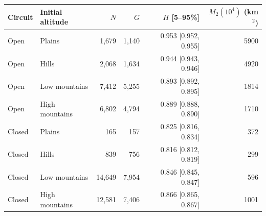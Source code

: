 \begin{tabular}{llrrrr}
\toprule
Circuit & Initial altitude & $N$ & $G$ & $H$ [5--95\%] & $M_2(10^4)$ (km$^2$)\\
\midrule
Open & Plains & 1,679 & 1,140 & 0.953 [0.952, 0.955] & 5900\\
Open & Hills & 2,068 & 1,634 & 0.944 [0.943, 0.946] & 4920\\
Open & Low mountains & 7,412 & 5,255 & 0.893 [0.892, 0.895] & 1814\\
Open & High mountains & 6,802 & 4,794 & 0.889 [0.888, 0.890] & 1710\\
Closed & Plains & 165 & 157 & 0.825 [0.816, 0.834] & 372\\
Closed & Hills & 839 & 756 & 0.816 [0.812, 0.819] & 299\\
Closed & Low mountains & 14,649 & 7,954 & 0.846 [0.845, 0.847] & 596\\
Closed & High mountains & 12,581 & 7,406 & 0.866 [0.865, 0.867] & 1001\\
\bottomrule
\end{tabular}
